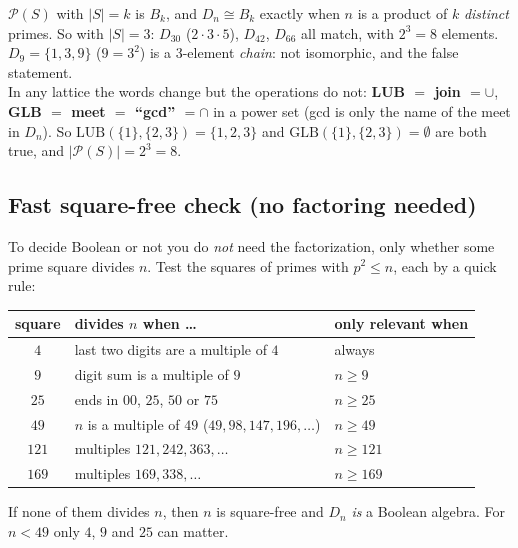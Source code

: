 \documentclass{fkt-notes}
\theoremstyle{definition}
\begin{document}
\begin{example}
  $\mathcal P(S)$ with $|S|=k$ is $B_k$, and $D_n\cong B_k$ exactly when
  $n$ is a product of $k$ \emph{distinct} primes. So with $|S|=3$:
  $D_{30}$ ($2\cdot3\cdot5$), $D_{42}$, $D_{66}$ all match, with $2^3=8$
  elements. $D_9=\{1,3,9\}$ ($9=3^2$) is a 3-element \emph{chain}: not
  isomorphic, and the false statement.\\
  In any lattice the words change but the operations do not:
  \textbf{LUB $=$ join $=\cup$}, \textbf{GLB $=$ meet $=$ ``gcd'' $=\cap$} in
  a power set (gcd is only the name of the meet in $D_n$). So
  $\mathrm{LUB}(\{1\},\{2,3\})=\{1,2,3\}$ and
  $\mathrm{GLB}(\{1\},\{2,3\})=\emptyset$ are both true, and
  $|\mathcal P(S)|=2^3=8$.
\end{example}

\subsection{Fast square-free check (no factoring needed)}
%
To decide Boolean or not you do \emph{not} need the factorization, only
whether some prime square divides $n$. Test the squares of primes with
$p^2\le n$, each by a quick rule:

\begin{center}
  \renewcommand{\arraystretch}{1.25}
  \begin{tabular}{@{}cll@{}}
    \toprule
    square & divides $n$ when \ldots                           & only relevant when \\
    \midrule
    $4$    & last two digits are a multiple of $4$             & always             \\
    $9$    & digit sum is a multiple of $9$                    & $n\ge9$            \\
    $25$   & ends in $00$, $25$, $50$ or $75$                  & $n\ge25$           \\
    $49$   & $n$ is a multiple of $49$ ($49,98,147,196,\dots$) & $n\ge49$           \\
    $121$  & multiples $121,242,363,\dots$                     & $n\ge121$          \\
    $169$  & multiples $169,338,\dots$                         & $n\ge169$          \\
    \bottomrule
  \end{tabular}
\end{center}
If none of them divides $n$, then $n$ is square-free and $D_n$ \emph{is} a
Boolean algebra. For $n<49$ only $4$, $9$ and $25$ can matter.
\end{document}
